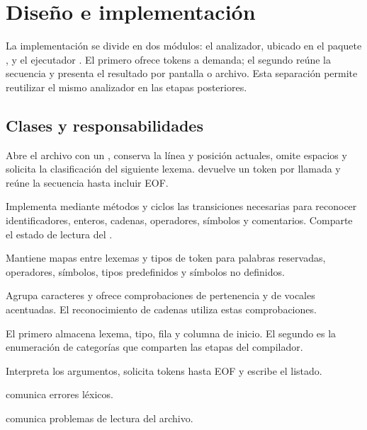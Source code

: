 \section{Diseño e implementación}
La implementación se divide en dos módulos: el analizador, ubicado en el
paquete , y el ejecutador
. El primero ofrece tokens a demanda;
el segundo reúne la secuencia y presenta el resultado por pantalla o archivo.
Esta separación permite reutilizar el mismo analizador en las etapas posteriores.

\subsection{Clases y responsabilidades}
\begin{description}[style=nextline]
  \item[\lexcode{Lexer}]
  Abre el archivo con un , conserva la línea y posición
  actuales, omite espacios y solicita la clasificación del siguiente lexema.
   devuelve un token por llamada y
   reúne la secuencia hasta incluir EOF.
  \item[\lexcode{TokenClassifier}]
  Implementa mediante métodos y ciclos las transiciones necesarias para
  reconocer identificadores, enteros, cadenas, operadores, símbolos y
  comentarios. Comparte el estado de lectura del .
  \item[\lexcode{TokenDefinitions}]
  Mantiene mapas entre lexemas y tipos de token para palabras reservadas,
  operadores, símbolos, tipos predefinidos y símbolos no definidos.
  \item[\lexcode{Alphabet}]
  Agrupa caracteres y ofrece comprobaciones de pertenencia y de vocales
  acentuadas. El reconocimiento de cadenas utiliza estas comprobaciones.
  \item[\lexcode{Token} y \lexcode{TokenType}]
  El primero almacena lexema, tipo, fila y columna de inicio. El segundo es
  la enumeración de categorías que comparten las etapas del compilador.
  \item[\lexcode{Etapa1}]
  Interpreta los argumentos, solicita tokens hasta EOF y escribe el listado.
  \item[Excepciones]
   comunica errores léxicos.\par
   comunica problemas de lectura del archivo.
\end{description}

